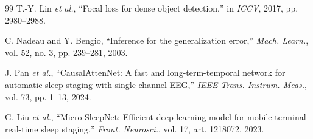 \documentclass[conference]{IEEEtran}
\begin{document}
\begin{thebibliography}{99}
 T.-Y. Lin \emph{et al.}, ``Focal loss for dense object detection,'' in \emph{ICCV},
2017, pp. 2980--2988.

 C. Nadeau and Y. Bengio, ``Inference for the generalization error,'' \emph{Mach.
Learn.}, vol. 52, no. 3, pp. 239--281, 2003.

 J. Pan \emph{et al.}, ``CausalAttenNet: A fast and long-term-temporal network
for automatic sleep staging with single-channel EEG,'' \emph{IEEE Trans. Instrum. Meas.}, vol. 73,
pp. 1--13, 2024.

 G. Liu \emph{et al.}, ``Micro SleepNet: Efficient deep learning model for
mobile terminal real-time sleep staging,'' \emph{Front. Neurosci.}, vol. 17, art. 1218072, 2023.

\end{thebibliography}
\end{document}
